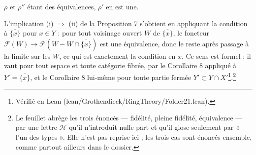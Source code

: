 \documentclass[11pt,a4paper]{article}
\begin{document}
$\rho$ et $\rho''$ étant des équivalences, $\rho'$ en est une.

L'implication (i) $\Rightarrow$ (ii) de la Proposition 7 s'obtient en appliquant
la condition à $\overline{\{x\}}$ pour $x \in Y$ : pour tout voisinage ouvert
$W$ de $\overline{\{x\}}$, le foncteur $\mathcal{F}(W) \to \mathcal{F}(W - W
\cap \overline{\{x\}})$ est une équivalence, donc le reste après passage à la
limite sur les $W$, ce qui est exactement la condition en $x$. Ce sens est
formel : il vaut pour tout espace et toute catégorie fibrée, par le
Corollaire 8 appliqué à $Y' = \overline{\{x\}}$, et le Corollaire 8 lui-même
pour toute partie fermée $Y' \subset Y \cap X'$\footnote{Vérifié en Lean
(lean/Grothendieck/RingTheory/Folder21.lean).}.\footnote{Le
feuillet abrège les trois énoncés — fidélité, pleine fidélité, équivalence — par
une lettre $\mathcal{H}$ qu'il n'introduit nulle part et qu'il glose seulement
par « l'un des types ». Elle n'est pas reprise ici ; les trois cas sont énoncés
ensemble, comme partout ailleurs dans le dossier.}
\end{document}
